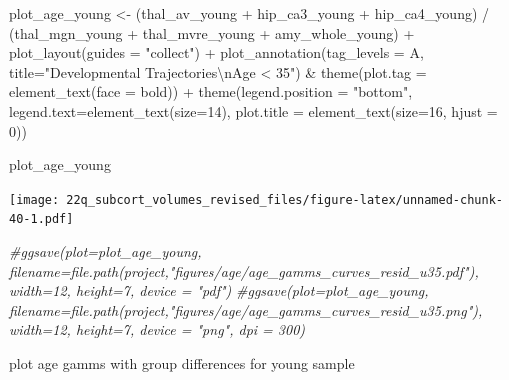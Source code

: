 \documentclass[
]{article}
\newenvironment{Shaded}{\begin{snugshade}}{\end{snugshade}}
\newcommand{\AttributeTok}[1]{\textcolor[rgb]{0.77,0.63,0.00}{#1}}
\newcommand{\CommentTok}[1]{\textcolor[rgb]{0.56,0.35,0.01}{\textit{#1}}}
\newcommand{\DecValTok}[1]{\textcolor[rgb]{0.00,0.00,0.81}{#1}}
\newcommand{\FunctionTok}[1]{\textcolor[rgb]{0.00,0.00,0.00}{#1}}
\newcommand{\NormalTok}[1]{#1}
\newcommand{\OtherTok}[1]{\textcolor[rgb]{0.56,0.35,0.01}{#1}}
\newcommand{\SpecialCharTok}[1]{\textcolor[rgb]{0.00,0.00,0.00}{#1}}
\newcommand{\StringTok}[1]{\textcolor[rgb]{0.31,0.60,0.02}{#1}}
\begin{document}
\begin{Shaded}
\begin{Highlighting}[]
\NormalTok{plot\_age\_young }\OtherTok{\textless{}{-}}\NormalTok{ (thal\_av\_young }\SpecialCharTok{+}\NormalTok{ hip\_ca3\_young }\SpecialCharTok{+}\NormalTok{ hip\_ca4\_young) }\SpecialCharTok{/}\NormalTok{ (thal\_mgn\_young }\SpecialCharTok{+}\NormalTok{ thal\_mvre\_young }\SpecialCharTok{+}\NormalTok{ amy\_whole\_young) }\SpecialCharTok{+} \FunctionTok{plot\_layout}\NormalTok{(}\AttributeTok{guides =} \StringTok{"collect"}\NormalTok{) }\SpecialCharTok{+} \FunctionTok{plot\_annotation}\NormalTok{(}\AttributeTok{tag\_levels =} \StringTok{\textquotesingle{}A\textquotesingle{}}\NormalTok{, }\AttributeTok{title=}\StringTok{"Developmental Trajectories}\SpecialCharTok{\textbackslash{}n}\StringTok{Age \textless{} 35"}\NormalTok{) }\SpecialCharTok{\&}   \FunctionTok{theme}\NormalTok{(}\AttributeTok{plot.tag =} \FunctionTok{element\_text}\NormalTok{(}\AttributeTok{face =} \StringTok{\textquotesingle{}bold\textquotesingle{}}\NormalTok{)) }\SpecialCharTok{+} \FunctionTok{theme}\NormalTok{(}\AttributeTok{legend.position =} \StringTok{"bottom"}\NormalTok{, }\AttributeTok{legend.text=}\FunctionTok{element\_text}\NormalTok{(}\AttributeTok{size=}\DecValTok{14}\NormalTok{), }\AttributeTok{plot.title =} \FunctionTok{element\_text}\NormalTok{(}\AttributeTok{size=}\DecValTok{16}\NormalTok{, }\AttributeTok{hjust =} \DecValTok{0}\NormalTok{)) }

\NormalTok{plot\_age\_young}
\end{Highlighting}
\end{Shaded}

\texttt{[image: 22q\_subcort\_volumes\_revised\_files/figure-latex/unnamed-chunk-40-1.pdf]}

\begin{Shaded}
\begin{Highlighting}[]
\CommentTok{\#ggsave(plot=plot\_age\_young, filename=file.path(project,"figures/age/age\_gamms\_curves\_resid\_u35.pdf"), width=12, height=7, device = "pdf")}
\CommentTok{\#ggsave(plot=plot\_age\_young, filename=file.path(project,"figures/age/age\_gamms\_curves\_resid\_u35.png"), width=12, height=7, device = "png", dpi = 300)}
\end{Highlighting}
\end{Shaded}

plot age gamms with group differences for young sample
\end{document}
